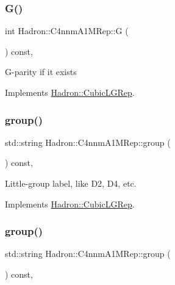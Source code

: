 \subsubsection{\texorpdfstring{G()}{G()}\hspace{0.1cm}{\footnotesize\ttfamily [2/2]}}
{\footnotesize\ttfamily int Hadron\+::\+C4nnm\+A1\+M\+Rep\+::G (\begin{DoxyParamCaption}{ }\end{DoxyParamCaption}) const\hspace{0.3cm}{\ttfamily [inline]}, {\ttfamily [virtual]}}

G-\/parity if it exists 

Implements \mbox{\hyperlink{structHadron_1_1CubicLGRep_ace26f7b2d55e3a668a14cb9026da5231}{Hadron\+::\+Cubic\+L\+G\+Rep}}.

\mbox{\label{structHadron_1_1C4nnmA1MRep_a06930a4ede24739b06df899ea0e6893d}} 
\subsubsection{\texorpdfstring{group()}{group()}\hspace{0.1cm}{\footnotesize\ttfamily [1/2]}}
{\footnotesize\ttfamily std\+::string Hadron\+::\+C4nnm\+A1\+M\+Rep\+::group (\begin{DoxyParamCaption}{ }\end{DoxyParamCaption}) const\hspace{0.3cm}{\ttfamily [inline]}, {\ttfamily [virtual]}}

Little-\/group label, like D2, D4, etc. 

Implements \mbox{\hyperlink{structHadron_1_1CubicLGRep_a9bdb14b519a611d21379ed96a3a9eb41}{Hadron\+::\+Cubic\+L\+G\+Rep}}.

\mbox{\label{structHadron_1_1C4nnmA1MRep_a06930a4ede24739b06df899ea0e6893d}} 
\subsubsection{\texorpdfstring{group()}{group()}\hspace{0.1cm}{\footnotesize\ttfamily [2/2]}}
{\footnotesize\ttfamily std\+::string Hadron\+::\+C4nnm\+A1\+M\+Rep\+::group (\begin{DoxyParamCaption}{ }\end{DoxyParamCaption}) const\hspace{0.3cm}{\ttfamily [inline]}, {\ttfamily [virtual]}}

